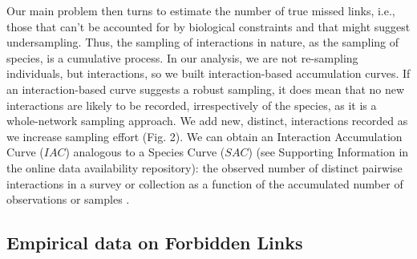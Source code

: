 \documentclass[12pt]{article}
\begin{document}
Our main problem then turns to estimate the number of true missed links, i.e., those that can't be accounted for by biological constraints and that might suggest undersampling. Thus, the sampling of interactions in nature, as the sampling of species, is a cumulative process. In our analysis, we are not re-sampling individuals, but interactions, so we built interaction-based accumulation curves. If an interaction-based curve suggests  a robust sampling, it does mean that no new interactions are likely to be recorded, irrespectively of the species, as it is a whole-network sampling approach. We add new, distinct, interactions recorded as we increase sampling effort (Fig. 2). We can obtain an Interaction Accumulation Curve ($IAC$) analogous to a Species Curve ($SAC$) (see Supporting Information in the online data availability repository): the observed number of distinct pairwise interactions in a survey or collection as a function of the accumulated number of observations or samples \citep{Colwell:2009gv}. 

\subsection*{Empirical data on Forbidden Links}
\end{document}
